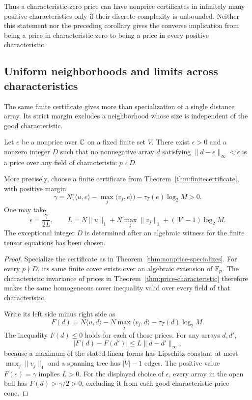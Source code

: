 Thus a characteristic-zero price can have nonprice certificates
in infinitely many positive characteristics only if their
discrete complexity is unbounded.  Neither this statement nor
the preceding corollary gives the converse implication from
being a price in characteristic zero to being a price in every
positive characteristic.

\subsection{Uniform neighborhoods and limits across characteristics}

The same finite certificate gives more than specialization of a
single distance array. Its strict margin excludes a neighborhood
whose size is independent of the good characteristic.

\begin{proposition}
\label{prop:robust-nonprice-specialization}
Let $e$ be a nonprice over $\mathbb C$ on a fixed finite set $V$.
There exist $\epsilon>0$ and a nonzero integer $D$ such that no
nonnegative array $d$ satisfying $\|d-e\|_\infty<\epsilon$ is a
price over any field of characteristic $p\nmid D$.

More precisely, choose a finite certificate from
Theorem~\ref{thm:finitecertificate}, with positive margin
\[
 \gamma=N\bigl(\langle u,e\rangle-
                  \max_j\langle v_j,e\rangle\bigr)
                   -\tau_T(e)\log_2M>0.
\]
One may take
\[
 \epsilon=\frac{\gamma}{2L},\qquad
 L=N\|u\|_1+N\max_j\|v_j\|_1+(|V|-1)\log_2M.
\]
The exceptional integer $D$ is determined after an algebraic
witness for the finite tensor equations has been chosen.
\end{proposition}

\begin{proof}
Specialize the certificate as in
Theorem~\ref{thm:nonprice-specializes}.
For every $p\nmid D$, its same finite cover exists over an algebraic
extension of $\mathbb F_p$. The characteristic invariance of prices in
Theorem~\ref{thm:price-characteristic} therefore makes the same
homogeneous cover inequality valid over every field of that
characteristic.

Write its left side minus right side as
\[
 F(d)=N\langle u,d\rangle-N\max_j\langle v_j,d\rangle
                                      -\tau_T(d)\log_2M.
\]
The inequality $F(d)\le0$ holds for each of those prices.
For any arrays $d,d'$,
\[
 |F(d)-F(d')|\le L\|d-d'\|_\infty,
\]
because a maximum of the stated linear forms has Lipschitz
constant at most $\max_j\|v_j\|_1$ and a spanning tree has
$|V|-1$ edges. The positive value $F(e)=\gamma$ implies $L>0$.
For the displayed choice of $\epsilon$, every array in the open
ball has $F(d)>\gamma/2>0$, excluding it from each good-characteristic
price cone.
\end{proof}

